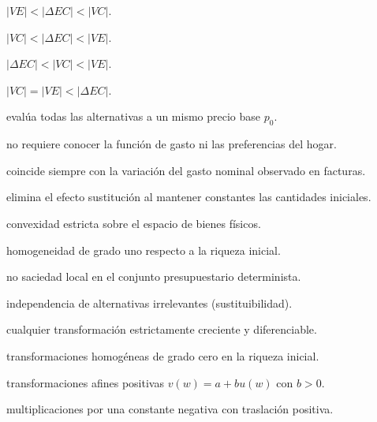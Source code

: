 \begin{opts}
    \item $|VE| < |\Delta EC| < |VC|$.
    \item $|VC| < |\Delta EC| < |VE|$.
    \item $|\Delta EC| < |VC| < |VE|$.
    \item $|VC| = |VE| < |\Delta EC|$.
\end{opts}

\begin{opts}
    \item evalúa todas las alternativas a un mismo precio base $p_0$.
    \item no requiere conocer la función de gasto ni las preferencias del hogar.
    \item coincide siempre con la variación del gasto nominal observado en facturas.
    \item elimina el efecto sustitución al mantener constantes las cantidades iniciales.
\end{opts}

\begin{opts}
    \item convexidad estricta sobre el espacio de bienes físicos.
    \item homogeneidad de grado uno respecto a la riqueza inicial.
    \item no saciedad local en el conjunto presupuestario determinista.
    \item independencia de alternativas irrelevantes (sustituibilidad).
\end{opts}

\begin{opts}
    \item cualquier transformación estrictamente creciente y diferenciable.
    \item transformaciones homogéneas de grado cero en la riqueza inicial.
    \item transformaciones afines positivas $v(w) = a + b u(w)$ con $b > 0$.
    \item multiplicaciones por una constante negativa con traslación positiva.
\end{opts}

